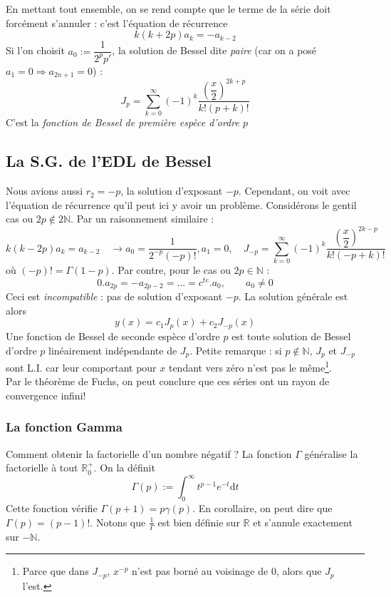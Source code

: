 	En mettant tout ensemble, on se rend compte que le terme de la série doit forcément 
	s'annuler : c'est l'équation de récurrence
	\begin{equation}
	k(k+2p)a_k = -a_{k-2}
	\end{equation}
	Si l'on choisit $\displaystyle a_0 := \dfrac{1}{2^pp'}$, la solution de Bessel 
	dite \textit{paire} (car on a posé $a_1=0 \Rightarrow a_{2n+1}=0$) :
	\begin{equation}
	J_p =  \sum_{k=0}^\infty (-1)^k \dfrac{\left(\dfrac{x}{2}\right)^{2k+p}}{
	k!(p+k)!}
	\end{equation}
	C'est la \textit{fonction de Bessel de première espèce d'ordre $p$}

	\subsection{La S.G. de l'EDL de Bessel}	
	Nous avions aussi $r_2 = -p$, la solution d'exposant $-p$. Cependant, on 
	voit avec l'équation de récurrence qu'il peut ici y avoir un problème. Considérons 
	le gentil cas ou $2p \notin 2\mathbb{N}$. Par un raisonnement similaire :
	\begin{equation}
	k(k-2p)a_k = a_{k-2}\quad \rightarrow a_0=\dfrac{1}{2^{-p}(-p)!}, a_1=0, \quad 
	J_{-p} = \sum_{k=0}^\infty (-1)^k \dfrac{\left(\dfrac{x}{2}\right)^{2k-p}}{
	k!(-p+k)!}
	\end{equation}
	où $(-p)! = \Gamma(1-p)$. Par contre, pour le cas ou $2p\in\mathbb{N}$ :
	\begin{equation}
	0.a_{2p} = -a_{2p-2} = \dots = c^{te}.a_0,\qquad a_0\neq 0
	\end{equation}
	Ceci est \textit{incompatible} : pas de solution d'exposant $-p$. La solution 
	générale est alors
	\begin{equation}
	y(x) = c_1J_p(x) + c_2J_{-p}(x)
	\end{equation}
	Une fonction de Bessel de seconde espèce d'ordre $p$ est toute solution de Bessel 
	d'ordre $p$ linéairement indépendante de $J_p$. Petite remarque : si $p\notin 
	\mathbb{N}$, $J_p$ et $J_{-p}$ sont L.I. car leur comportant pour $x$ tendant vers 
	zéro n'est pas le même\footnote{Parce que dans $J_{-p}$, $x^{-p}$ n'est pas borné 
	au voisinage de 0, alors que $J_p$ l'est.}.\\
	Par le théorème de Fuchs, on peut conclure que ces séries ont un rayon de convergence 
	infini!

	\subsubsection*{La fonction Gamma}
	Comment obtenir la factorielle d'un nombre négatif ? La fonction $\Gamma$ généralise 
	la factorielle à tout $\mathbb{R}_0^+$. On la définit
	\begin{equation}
	\Gamma(p) := \int_0^\infty t^{p-1}e^{-t}\text{d}t
	\end{equation}
	Cette fonction vérifie $\Gamma(p+1)=p\gamma(p)$. En corollaire, on peut dire que 
	$\Gamma(p) = (p-1)!$. Notons que $\frac{1}{\Gamma}$ est bien définie sur $\mathbb{R}$ 
	et s'annule exactement sur $-\mathbb{N}$.
	
